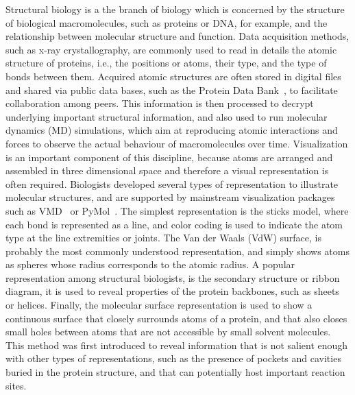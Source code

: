 Structural biology is a the branch of biology which is concerned by the structure of biological macromolecules, such as proteins or DNA, for example, and the relationship between molecular structure and function.
Data acquisition methods, such as x-ray crystallography, are commonly used to read in details the atomic structure of proteins, i.e., the positions or atoms, their type, and the type of bonds between them.
Acquired atomic structures are often stored in digital files and shared via public data bases, such as the Protein Data Bank~\cite{bernstein1977protein}, to facilitate collaboration among peers.
This information is then processed to decrypt underlying important structural information, and also used to run molecular dynamics (MD) simulations, which aim at reproducing atomic interactions and forces to observe the actual behaviour of macromolecules over time.
Visualization is an important component of this discipline, because atoms are arranged and assembled in three dimensional space and therefore a visual representation is often required.
Biologists developed several types of representation to illustrate molecular structures, and are supported by mainstream visualization packages such as VMD~\cite{humphrey1996vmd} or PyMol~\cite{PyMOL}.
The simplest representation is the sticks model, where each bond is represented as a line, and color coding is used to indicate the atom type at the line extremities or joints.
The Van der Waals (VdW) surface, is probably the most commonly understood representation, and simply shows atoms as spheres whose radius corresponds to the atomic radius.
A popular representation among structural biologists, is the secondary structure or ribbon diagram, it is used to reveal properties of the protein backbones, such as sheets or helices.
Finally, the molecular surface representation is used to show a continuous surface that closely surrounds atoms of a protein, and that also closes small holes between atoms that are not accessible by small solvent molecules.
This method was first introduced to reveal information that is not salient enough with other types of representations, such as the presence of pockets and cavities buried in the protein structure, and that can potentially host important reaction sites.

